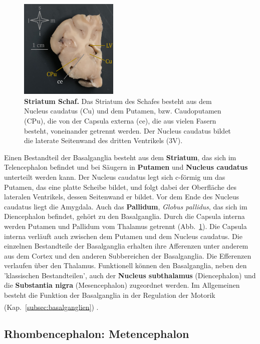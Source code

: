 \documentclass[12pt,a4paper,pdftex]{article}
\begin{document}
\begin{figure}
    \centering
    \includegraphics[width=0.42\textwidth]{pictures/Bilder_Jule/Schaf/Ausschnitte/Striatum.png}
    \caption[Striatum Schaf]{\textbf{Striatum Schaf.} Das Striatum des Schafes besteht aus dem Nucleus caudatus (Cu) und dem Putamen, bzw. Caudoputamen (CPu), die von der Capsula externa (ce), die aus vielen Fasern besteht, voneinander getrennt werden. Der Nucleus caudatus bildet die laterate Seitenwand des dritten Ventrikels (3V).}
    \label{fig:striatum}
\end{figure}

\noindent Einen Bestandteil der Basalganglia besteht aus dem \textbf{Striatum}, das sich im Telencephalon befindet und bei Säugern in \textbf{Putamen} und \textbf{Nucleus caudatus}  unterteilt werden kann. Der Nucleus caudatus legt sich c-förmig um das Putamen, das eine platte Scheibe bildet, und folgt dabei der Oberfläche des lateralen Ventrikels, dessen Seitenwand er bildet. Vor dem Ende des Nucleus caudatus liegt die Amygdala. Auch das \textbf{Pallidum}, \textit{Globus pallidus}, das sich im Diencephalon befindet, gehört zu den Basalganglia. Durch die Capsula interna werden Putamen und Pallidum vom Thalamus getrennt (Abb.~\ref{fig:striatum}). Die Capsula interna verläuft auch zwischen dem Putamen und dem Nucleus caudatus. Die einzelnen Bestandteile der Basalganglia erhalten ihre Afferenzen unter anderem aus dem Cortex und den anderen Subbereichen der Basalganglia. Die Efferenzen verlaufen über den Thalamus. Funktionell können den Basalganglia, neben den 'klassischen Bestandteilen', auch der \textbf{Nucleus subthalamus} (Diencephalon) und die \textbf{Substantia nigra} (Mesencephalon) zugeordnet werden.
Im Allgemeinen besteht die Funktion der Basalganglia in der Regulation der Motorik (Kap.~\ref{subsec:basalganglien}) \textsuperscript{\cite[9]{trepel2011neuroanatomie}}.


\subsection{Rhombencephalon: Metencephalon}
\label{subsec:Metencephalon} 
\end{document}
